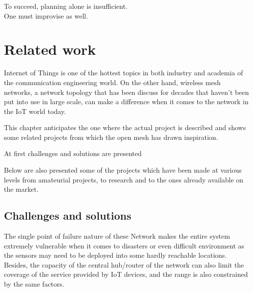 
\begin{savequote}[70mm]
	To succeed, planning alone is insufficient.\\One must improvise as well.
\end{savequote}


\chapter{Related work}\label{chapter:related_work}

	Internet  of  Things  is  one  of  the  hottest  topics  in 
	both  industry  and  academia  of  the  communication  engineering 
	world.
	On  the  other  hand,  wireless  mesh  networks,  a  network 
	topology that has been discuss for decades that haven’t been put 
	into use in large scale, can make a difference when it comes to the 
	network  in  the  IoT  world  today.

	This chapter anticipates the one where the actual project is described and shows some related projects from which the open mesh has drawn inspiration.
	
	At first challenges and solutions are presented
	
	Below are also presented some of the projects which have been made at various levels from amateurial projects, to research and to the ones already available on the market.
	
	\section{Challenges and solutions}
		
	
		The  single  point  of  failure  nature  of  these  
		Network makes the entire system extremely vulnerable when it 
		comes to disasters or even difficult environment as the sensors 
		may need to be deployed into some hardly reachable locations.
		Besides,  the  capacity  of  the  central  hub/router  of  the  network  
		can  also  limit  the  coverage  of  the  service  provided  by  IoT  
		devices,  and the range is  also constrained by  the  same  factors.
	
